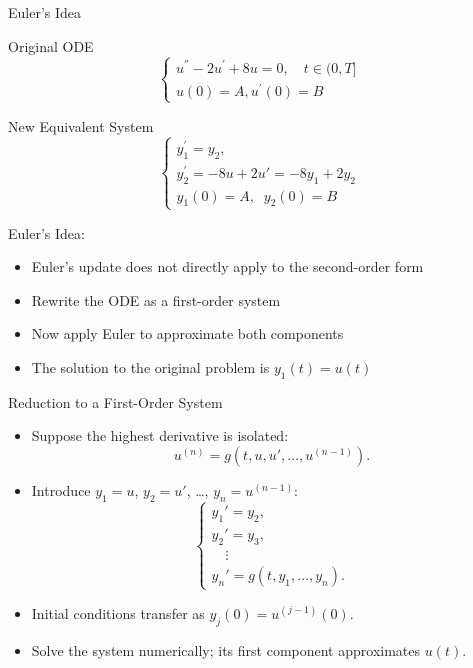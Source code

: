 \documentclass[10pt]{beamer}
\begin{document}
\begin{frame}{Euler's Idea}

\begin{block}{Original ODE}
    $$
    \begin{cases}
    u^{''}- 2 u^\prime + 8 u  = 0, \quad t \in (0,T]\\
    u(0) = A, u^\prime(0) = B
    \end{cases}
    $$
\end{block}

\begin{block}{New Equivalent System}
    \[
    \begin{cases}
    y_1^\prime = y_2, \\
    y_2^\prime = -8u+2u'=-8y_1+2y_2\\
    y_1(0)=A,\;\; y_2(0)=B
    \end{cases}
    \]
\end{block}

Euler's Idea:
\begin{itemize}
    \item Euler's update does not directly apply to the second-order form
    \item Rewrite the ODE as a first-order system 
    \item Now apply Euler to approximate both components 
    \item The solution to the original problem is $y_1(t) = u(t)$
\end{itemize}
    
\end{frame}

\begin{frame}{Reduction to a First-Order System}
\begin{itemize}
    \item Suppose the highest derivative is isolated:
    \[u^{(n)}=g(t,u,u',\ldots,u^{(n-1)}).\]
    \item Introduce $y_1=u$, $y_2=u'$, \ldots, $y_n=u^{(n-1)}$:
    \[
    \begin{cases}
    y_1'=y_2,\\
    y_2'=y_3,\\
    \quad\vdots\\
    y_n'=g(t,y_1,\ldots,y_n).
    \end{cases}
    \]
    \item Initial conditions transfer as $y_j(0)=u^{(j-1)}(0)$.
    \item Solve the system numerically; its first component approximates $u(t)$.
\end{itemize}
\end{frame}
\end{document}
